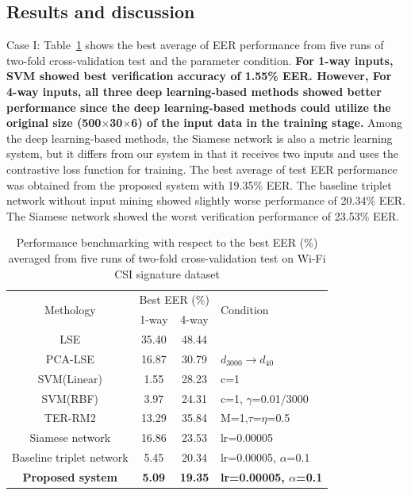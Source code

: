 \documentclass[sigconf]{acmart}
\begin{document}
\subsection{Results and discussion}

Case I: Table~\ref{tab3} shows the best average of EER performance from five runs of two-fold cross-validation test and the parameter condition. 
\textbf{For 1-way inputs, SVM showed best verification accuracy of 1.55\% EER. However, For 4-way inputs, all three deep learning-based methods showed better performance since the deep learning-based methods could utilize the original size (500$\times$30$\times$6) of the input data in the training stage.} Among the deep learning-based methods, the Siamese network is also a metric learning system, but it differs from our system in that it receives two inputs and uses the contrastive loss function for training. 
The best average of test EER performance was obtained from the proposed system with 19.35\% EER. The baseline triplet network without input mining showed slightly worse performance of 20.34\% EER. The Siamese network showed the worst verification performance of 23.53\% EER.
\begin{table}
    \caption{Performance benchmarking with respect to the best EER (\%) averaged from five runs of two-fold cross-validation test on Wi-Fi CSI signature dataset}
    \label{tab3}
    \begin{tabular}{cccl}
    \toprule
    \multirow{2}{*}{Methology} & \multicolumn{2}{c}{Best EER (\%)} & \multirow{2}{*}{Condition} \\ \cline{2-3}
                            & 1-way     & 4-way     &                            \\
    \midrule
    LSE                                    & 35.40 & 48.44           &                           \\ 
    PCA-LSE                                & 16.87 & 30.79           & $d_{3000} \rightarrow d_{40}$       \\ 
    SVM(Linear)                            & 1.55 & 28.23            & c=1                        \\ 
    SVM(RBF)                               & 3.97 & 24.31            & c=1, $\gamma$=0.01/3000    \\ 
    TER-RM2                                & 13.29 & 35.84          & M=1,$\tau$=$\eta$=0.5      \\
    \midrule
    Siamese network                        & 16.86 & 23.53           & lr=0.00005                 \\ 
    Baseline triplet network               & 5.45 & 20.34           & lr=0.00005, $\alpha$=0.1   \\ 
    \textbf{Proposed system}               & \textbf{5.09} & \textbf{19.35}           & \textbf{lr=0.00005, $\alpha$=0.1}   \\
    \bottomrule
    \end{tabular}
\end{table}
\end{document}
